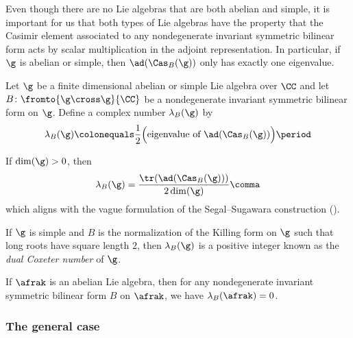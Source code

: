 Even though there are no Lie algebras that are both abelian and simple, it is important for us that both types of Lie algebras have the property that the Casimir element associated to any nondegenerate invariant symmetric bilinear form acts by scalar multiplication in the adjoint representation.
In particular, if $ \g $ is abelian or simple, then $ \ad(\Cas_{B}(\g)) $ only has exactly one eigenvalue.

\begin{definition}
	Let $ \g $ be a finite dimensional abelian or simple Lie algebra over $ \CC $ and let $ B \colon \fromto{\g \cross \g}{\CC} $ be a nondegenerate invariant symmetric bilinear form on $ \g $.
	Define a complex number $ \lambda_B(\g) $ by 
	\begin{equation*}
		\lambda_B(\g) \colonequals \frac{1}{2} \Big(\text{eigenvalue of } \ad(\Cas_B(\g)) \Big) \period
	\end{equation*}
\end{definition}

\begin{nul}
	If $ \dim(\g) > 0 $, then 
	\begin{equation*}
		\lambda_B(\g) = \frac{\tr(\ad(\Cas_{B}(\g)))}{2\dim(\g)} \comma
	\end{equation*}
	which aligns with the vague formulation of the Segal--Sugawara construction ().
\end{nul}

\begin{example}
	If $ \g $ is simple and $ B $ is the normalization of the Killing form on $ \g $ such that long roots have square length $ 2 $, then $ \lambda_B(\g) $ is a positive integer  known as the \textit{dual Coxeter number} of $ \g $.
\end{example}

\begin{example}
	If $ \afrak $ is an abelian Lie algebra, then for any nondegenerate invariant symmetric bilinear form $ B $ on $ \afrak $, we have $ \lambda_{B}(\afrak) = 0 $.
\end{example}



\subsubsection{The general case}\label{subsec:SSgeneral}

